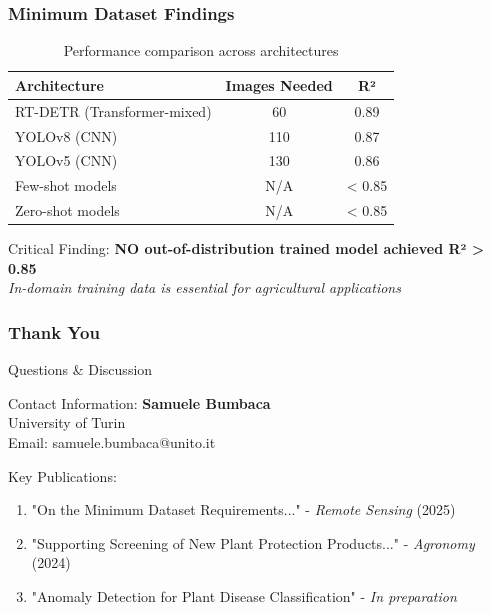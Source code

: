 \documentclass[aspectratio=43]{beamer}
\begin{document}
\begin{frame}
    \frametitle{Minimum Dataset Findings}
    
    \begin{table}
        \centering
        \begin{tabular}{|l|c|c|}
        \hline
        \textbf{Architecture} & \textbf{Images Needed} & \textbf{R²} \\
        \hline
        RT-DETR (Transformer-mixed) & 60 & 0.89 \\
        YOLOv8 (CNN) & 110 & 0.87 \\
        YOLOv5 (CNN) & 130 & 0.86 \\
        Few-shot models & N/A & < 0.85 \\
        Zero-shot models & N/A & < 0.85 \\
        \hline
        \end{tabular}
        \caption{Performance comparison across architectures}
    \end{table}
    
    \begin{alertblock}{Critical Finding:}
        \textbf{NO out-of-distribution trained model achieved R² > 0.85}\\
        \textit{In-domain training data is essential for agricultural applications}
    \end{alertblock}
\end{frame}

\begin{frame}
    \frametitle{Thank You}
    
    \begin{center}
        \Huge Questions \& Discussion
    \end{center}
    
    \vspace{2em}
    
    \begin{block}{Contact Information:}
        \textbf{Samuele Bumbaca}\\
        University of Turin\\
        Email: samuele.bumbaca@unito.it
    \end{block}
    
    \begin{block}{Key Publications:}
        \begin{enumerate}
            \item "On the Minimum Dataset Requirements..." - \textit{Remote Sensing} (2025)
            \item "Supporting Screening of New Plant Protection Products..." - \textit{Agronomy} (2024)
            \item "Anomaly Detection for Plant Disease Classification" - \textit{In preparation}
        \end{enumerate}
    \end{block}
\end{frame}
\end{document}
